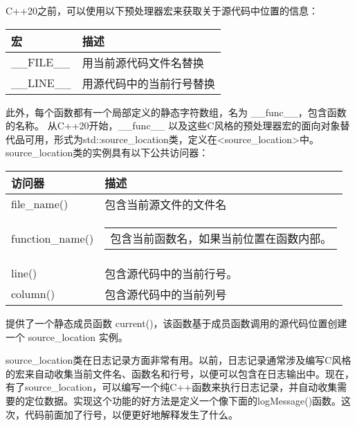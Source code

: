 

C++20之前，可以使用以下预处理器宏来获取关于源代码中位置的信息：

\begin{longtable}{|l|l|}
\hline
\textbf{宏} & \textbf{描述}                                     \\ \hline
\endfirsthead
%
\endhead
%
\_\_FILE\_\_   & 用当前源代码文件名替换
           \\ \hline
\_\_LINE\_\_   & 用源代码中的当前行号替换
 \\ \hline
\end{longtable}

此外，每个函数都有一个局部定义的静态字符数组，名为 \_\_func\_\_，包含函数的名称。
从C++20开始，\_\_func\_\_ 以及这些C风格的预处理器宏的面向对象替代品可用，形式为std::source\_location类，定义在<source\_location>中。source\_location类的实例具有以下公共访问器：


\begin{longtable}{|l|l|}
\hline
\textbf{访问器} & \textbf{描述}                                  \\ \hline
\endfirsthead
%
\endhead
%
file\_name()      & 包含当前源文件的文件名             \\ \hline
function\_name() & \begin{tabular}[c]{@{}l@{}}包含当前函数名，如果当前位置在函数内部。
\end{tabular} \\ \hline
line()            & 包含源代码中的当前行号。
  \\ \hline
column()          & 包含源代码中的当前列号
 \\ \hline
\end{longtable}

提供了一个静态成员函数 current()，该函数基于成员函数调用的源代码位置创建一个 source\_location 实例。


source\_location类在日志记录方面非常有用。以前，日志记录通常涉及编写C风格的宏来自动收集当前文件名、函数名和行号，以便可以包含在日志输出中。现在，有了source\_location，可以编写一个纯C++函数来执行日志记录，并自动收集需要的定位数据。实现这个功能的好方法是定义一个像下面的logMessage()函数。这次，代码前面加了行号，以便更好地解释发生了什么。

